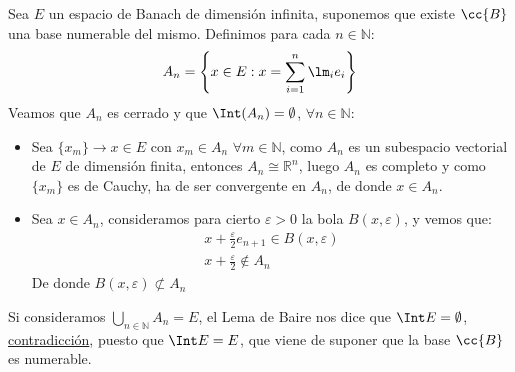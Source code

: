 \begin{ejercicio}
\begin{enumerate}[label=\alph*)]
            Sea $E$ un espacio de Banach de dimensión infinita, suponemos que existe $\cc{B}$ una base numerable del mismo. Definimos para cada $n\in \mathbb{N}$:
            \begin{equation*}
                A_n = \left\{x\in E : x = \sum_{i=1}^{n}\lm_i e_{i}\right\}
            \end{equation*}
            Veamos que $A_n$ es cerrado y que $\Int(A_n)=\emptyset $, $\forall n\in \mathbb{N}$:
            \begin{itemize}
                \item Sea $\{x_m\}\to x\in E$ con $x_m\in A_n$ $\forall m\in \mathbb{N}$, como $A_n$ es un subespacio vectorial de $E$ de dimensión finita, entonces $A_n\cong \mathbb{R}^n$, luego $A_n$ es completo y como $\{x_m\}$ es de Cauchy, ha de ser convergente en $A_n$, de donde $x\in A_n$.
                \item Sea $x\in A_n$, consideramos para cierto $\varepsilon>0$ la bola $B(x,\varepsilon)$, y vemos que:
                    \begin{gather*}
                        x+\frac{\varepsilon}{2} e_{n+1}\in B(x,\varepsilon) \\
                        x+\frac{\varepsilon}{2}\notin A_n
                    \end{gather*}
                    De donde $B(x,\varepsilon)\not\subset A_n$
            \end{itemize}
            Si consideramos $\bigcup_{n\in \mathbb{N}}A_n = E$, el Lema de Baire nos dice que $\Int E = \emptyset $, \underline{contradicción}, puesto que $\Int E = E$, que viene de suponer que la base $\cc{B}$ es numerable.
    \end{enumerate}
\end{ejercicio}

